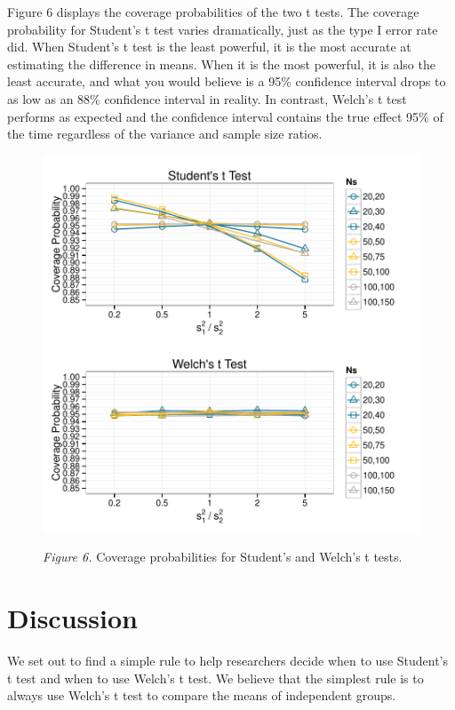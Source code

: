 \documentclass[man,a4paper,noextraspace,apacite]{apa6}
\begin{document}
Figure 6 displays the coverage probabilities of the two t tests. 
The coverage probability for Student's t test varies dramatically, just as the 
type I error rate did. When Student's t test is the least powerful, it is the 
most accurate at estimating the difference in means. When it is the most 
powerful, it is also the least accurate, and what you would believe is a 95\% 
confidence interval drops to as low as an 88\% confidence interval in reality. 
In contrast, Welch's t test performs as expected and the confidence interval 
contains the true effect 95\% of the time regardless of the variance and sample 
size ratios. 




\begin{figure}
\includegraphics{WelchManuscript-MASTER-CoveragePlots}

\textit{Figure 6.} Coverage probabilities for Student's and Welch's t tests.
\end{figure}

\section{Discussion}
    We set out to find a simple rule to help researchers decide when to use 
Student's t test and when to use Welch's t test. We believe that the simplest 
rule is to always use Welch's t test to compare the means of independent groups.
    
\end{document}
